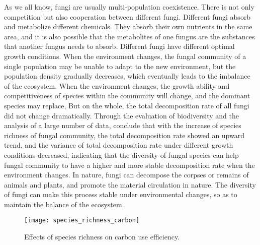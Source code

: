 \documentclass{mcmthesis}
\begin{document}
\begin{appendices}
As we all know, fungi are usually multi-population coexistence. There is not only competition but also cooperation between different fungi. Different fungi absorb and metabolize different chemicals. They absorb their own nutrients in the same area, and it is also possible that the metabolites of one fungus are the substances that another fungus needs to absorb. Different fungi have different optimal growth conditions. When the environment changes, the fungal community of a single population may be unable to adapt to the new environment, but the population density gradually decreases, which eventually leads to the imbalance of the ecosystem. When the environment changes, the growth ability and competitiveness of species within the community will change, and the dominant species may replace, But on the whole, the total decomposition rate of all fungi did not change dramatically. Through the evaluation of biodiversity and the analysis of a large number of data, conclude that with the increase of species richness of fungal community, the total decomposition rate showed an upward trend, and the variance of total decomposition rate under different growth conditions decreased, indicating that the diversity of fungal species can help fungal community to have a higher and more stable decomposition rate when the environment changes. In nature, fungi can decompose the corpses or remains of animals and plants, and promote the material circulation in nature. The diversity of fungi can make this process stable under environmental changes, so as to maintain the balance of the ecosystem.

\begin{figure}[H]
  \small
  \centering
  \texttt{[image: species\_richness\_carbon]}
  \caption{Effects of species richness on carbon use efficiency.}
  \label{species_richness_carbon}
\end{figure}

% 
\end{appendices}
\end{document}
